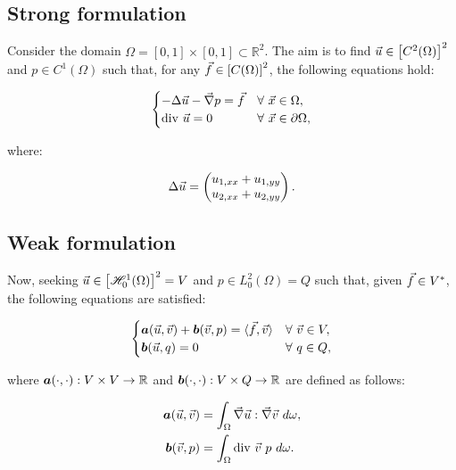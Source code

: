 \subsection{Strong formulation}

Consider the domain $\Omega = [0, 1] \times [0, 1] \subset \mathbb{R}^2$. The aim is to find $\vec{u} \in \left[ C^2(\Omega) \right]^2$ and $p \in C^1(\Omega)$ such that, for any $\vec{f} \in \left[ C(\Omega) \right]^2$, the following equations hold:

\begin{gather}
    \begin{cases} \label{strong_stokes}
        - \Delta \vec{u} - \vec{\nabla} p = \vec{f} & \forall ~ \vec{x} \in \Omega, \\
        \text{div } \vec{u} = 0 & \forall ~ \vec{x} \in \partial \Omega,
    \end{cases}
\end{gather}

where:

\begin{gather}
    \Delta \vec{u} = \begin{pmatrix}
        u_{1, xx} + u_{1, yy} \\
        u_{2, xx} + u_{2, yy}
    \end{pmatrix} .
\end{gather}

\subsection{Weak formulation}

Now, seeking $\vec{u} \in \left[ \mathscr{H}^1_0(\Omega) \right]^2 = V$ and $p \in L^2_0(\Omega) = Q$ such that, given $\vec{f} \in V^*$, the following equations are satisfied:

\begin{gather} \label{weak_stokes}
    \begin{cases}
        \bm{a}(\vec{u}, \vec{v}) + \bm{b}(\vec{v}, p) = \langle \vec{f}, \vec{v} \rangle & \forall ~ \vec{v} \in V,\\
        \bm{b}(\vec{u}, q) = 0 & \forall ~ q \in Q,
    \end{cases}
\end{gather}

where $\bm{a}(\cdot, \cdot): V \times V \rightarrow \mathbb{R}$ and $\bm{b}(\cdot, \cdot): V \times Q \rightarrow \mathbb{R}$ are defined as follows:

\begin{align}
    \bm{a}(\vec{u}, \vec{v}) &= \int_{\Omega} \vec{\nabla} \vec{u} : \vec{\nabla} \vec{v} ~ d \omega, \label{a} \\
    \bm{b}(\vec{v}, p) &= \int_{\Omega} \text{div } \vec{v} ~ p ~ d \omega. \label{b}
\end{align}

